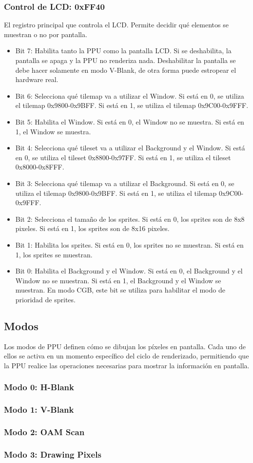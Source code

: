 \subsubsection{Control de LCD: 0xFF40}

El registro principal que controla el LCD. Permite decidir qué elementos se muestran o no por pantalla.

\begin{itemize}
    \item Bit 7: Habilita tanto la PPU como la pantalla LCD. Si se deshabilita, la pantalla se apaga y la PPU no renderiza nada. Deshabilitar la pantalla se debe hacer solamente en modo V-Blank, de otra forma puede estropear el hardware real.
    \item Bit 6: Selecciona qué tilemap va a utilizar el Window. Si está en 0, se utiliza el tilemap 0x9800-0x9BFF. Si está en 1, se utiliza el tilemap 0x9C00-0x9FFF.
    \item Bit 5: Habilita el Window. Si está en 0, el Window no se muestra. Si está en 1, el Window se muestra.
    \item Bit 4: Selecciona qué tileset va a utilizar el Background y el Window. Si está en 0, se utiliza el tileset 0x8800-0x97FF. Si está en 1, se utiliza el tileset 0x8000-0x8FFF.
    \item Bit 3: Selecciona qué tilemap va a utilizar el Background. Si está en 0, se utiliza el tilemap 0x9800-0x9BFF. Si está en 1, se utiliza el tilemap 0x9C00-0x9FFF.
    \item Bit 2: Selecciona el tamaño de los sprites. Si está en 0, los sprites son de 8x8 pixeles. Si está en 1, los sprites son de 8x16 pixeles.
    \item Bit 1: Habilita los sprites. Si está en 0, los sprites no se muestran. Si está en 1, los sprites se muestran.
    \item Bit 0: Habilita el Background y el Window. Si está en 0, el Background y el Window no se muestran. Si está en 1, el Background y el Window se muestran. En modo CGB, este bit se utiliza para habilitar el modo de prioridad de sprites.
\end{itemize}

\subsection{Modos}

Los modos de PPU definen cómo se dibujan los píxeles en pantalla. Cada uno de ellos se activa en un momento específico del ciclo de renderizado, permitiendo que la PPU realice las operaciones necesarias para mostrar la información en pantalla.

\subsubsection{Modo 0: H-Blank}



\subsubsection{Modo 1: V-Blank}
\subsubsection{Modo 2: OAM Scan}
\subsubsection{Modo 3: Drawing Pixels}


\cleardoublepage
